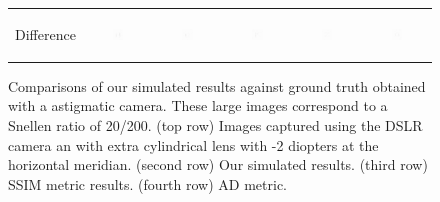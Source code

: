 \begin{figure}[!t]
\begin{tabular}{@{}r@{ } c@{ } c@{ } c@{ } c@{ } c }
	\begin{sideways} \parbox[b]{20mm} {Difference} \end{sideways} &
	\includegraphics[width=0.185\textwidth]{__Images/05/WB_20-200_-2@180/wb_N_20-200_Camera-2,00D@180(diff).png} &
	\includegraphics[width=0.185\textwidth]{__Images/05/WB_20-200_-2@180/wb_C_20-200_Camera-2,00D@180(diff).png} &
	\includegraphics[width=0.185\textwidth]{__Images/05/WB_20-200_-2@180/wb_K_20-200_Camera-2,00D@180(diff).png} &
	\includegraphics[width=0.185\textwidth]{__Images/05/WB_20-200_-2@180/wb_Z_20-200_Camera-2,00D@180(diff).png} &
	\includegraphics[width=0.185\textwidth]{__Images/05/WB_20-200_-2@180/wb_O_20-200_Camera-2,00D@180(diff).png} \\

	\end{tabular}
	
	\caption[Comparisons of our simulated results against ground truth obtained with a astigmatic camera]{Comparisons of our simulated results against ground truth obtained with a astigmatic camera. These large images correspond to a Snellen ratio of 20/200. (top row) Images captured using the DSLR camera an with extra cylindrical lens with -2 diopters at the horizontal meridian. (second row) Our simulated results. (third row) SSIM metric results. (fourth row) AD metric.}

	\label{fig:comparison_astig-2@180_wb}
\end{figure}
